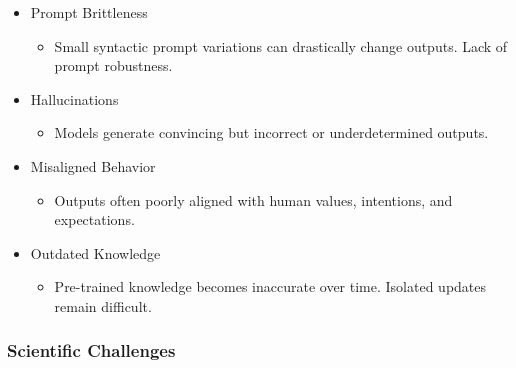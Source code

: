 \begin{itemize}

\item Prompt Brittleness
\begin{itemize}
\item Small syntactic prompt variations can drastically change outputs. Lack of prompt robustness.
\end{itemize}

\item Hallucinations
\begin{itemize}

\item Models generate convincing but incorrect or underdetermined outputs.
\end{itemize}

\item Misaligned Behavior
\begin{itemize}
\item Outputs often poorly aligned with human values, intentions, and expectations.
\end{itemize}

\item Outdated Knowledge
\begin{itemize}
\item Pre-trained knowledge becomes inaccurate over time. Isolated updates remain difficult.
\end{itemize}

\end{itemize}

\subsubsection{Scientific Challenges}

